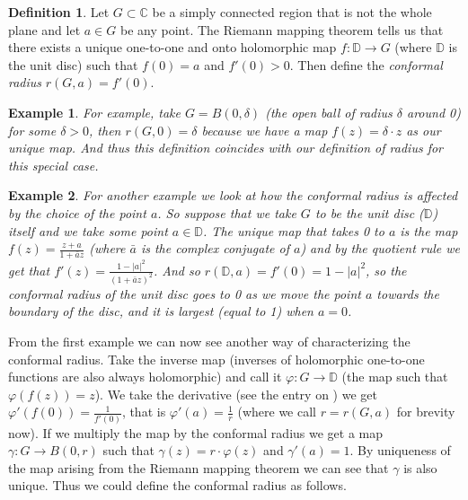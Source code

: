 \documentclass[12pt]{article}
\theoremstyle{theorem}
\newtheorem*{example}{Example}
\theoremstyle{definition}
\newtheorem*{defn}{Definition}
\begin{document}
\begin{defn}
Let $G \subset {\mathbb{C}}$ be a simply connected region that is not the whole
plane and let $a \in G$ be any point.
The Riemann mapping theorem tells us that there exists
a unique one-to-one and onto holomorphic map $f \colon {\mathbb{D}} \to G$ (where
${\mathbb{D}}$ is the unit disc) such that $f(0) = a$ and $f'(0) > 0$.  Then
define the {\em conformal radius} $r(G,a) = f'(0)$.
\end{defn}

\begin{example}
For example, take $G = B(0,\delta)$ (the open ball of radius $\delta$ around 0) for some $\delta > 0$, then $r(G,0) = \delta$ because
we have a map $f(z) = \delta \cdot z$ as our unique map.
And thus this definition
coincides with our  definition of radius for this special case.
\end{example}

\begin{example}
For another example we look at how the conformal radius is affected by
the choice of the point $a$.  So suppose that we take $G$ to be the unit disc
(${\mathbb{D}}$)
itself and we take some point $a \in {\mathbb{D}}$.
The unique map that takes 0 to $a$ is
the map $f(z) = \frac{z+a}{1+\bar{a}z}$ (where $\bar{a}$ is the complex conjugate of $a$) and by the quotient rule we get that
$f'(z) = \frac{1-\lvert a \rvert^2}{(1+\bar{a}z)^2}$.  And so
$r({\mathbb{D}},a) = f'(0) = 1-\lvert a \rvert^2$, so the conformal radius
of the unit disc goes to 0 as we move the point $a$ towards the boundary
of the disc, and
it is largest (equal to 1) when $a = 0$.
\end{example}

From the first example we can now see another way of characterizing the conformal
radius.  Take the inverse map (inverses of holomorphic one-to-one functions are also always holomorphic) and call it $\varphi \colon 
G \to {\mathbb{D}}$ (the map such that $\varphi (f(z)) = z$).
We take the derivative (see the entry on ) we get
$\varphi'(f(0)) = \frac{1}{f'(0)}$, that is
$\varphi'(a) = \frac{1}{r}$ (where we call $r = r(G,a)$ for brevity now).
If we multiply the map by
the conformal radius we get a map $\gamma\colon G \to B(0,r)$ such that
$\gamma (z) = r \cdot \varphi(z)$ and $\gamma'(a) = 1$.  By uniqueness of the
map arising from the Riemann mapping theorem we can see that $\gamma$ is
also unique.  Thus we could define the conformal radius as follows.
\end{document}
